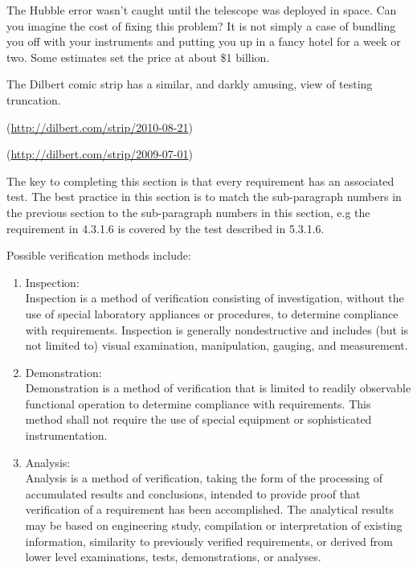 \begin{slshape}
The Hubble error wasn't caught until the telescope was deployed in space.  Can you imagine the cost of fixing this problem?  It is not simply a case of bundling you off with your instruments and putting you up in a fancy hotel for a week or two.  Some estimates set the price at about \$1 billion.
\bigskip

The Dilbert comic strip has a similar, and darkly amusing, view of testing truncation.
\bigskip  

(\url{http://dilbert.com/strip/2010-08-21})
\bigskip

(\url{http://dilbert.com/strip/2009-07-01})
\bigskip



	
The key to completing this section is that every requirement has an associated test.  The best practice in this section is to match the sub-paragraph numbers in the previous section to the sub-paragraph numbers in this section, e.g the requirement in 4.3.1.6 is covered by the test described in 5.3.1.6.
\bigskip

	Possible verification methods include:
	\bigskip
	
	\begin{enumerate}
		\item Inspection:\\

	Inspection is a method of verification consisting of investigation, 
	without the use of special laboratory appliances or procedures, to 
	determine compliance with requirements. Inspection is generally 
	nondestructive and includes (but is not limited to) visual examination, 
	manipulation, gauging, and measurement.

		\item Demonstration:\\

	Demonstration is a method of verification that is limited to readily 
	observable functional operation to determine compliance with 
	requirements. This method shall not require the use of special equipment 
	or sophisticated instrumentation.
	
		\item Analysis:\\

	Analysis is a method of verification, taking the form of the processing of 
	accumulated results and conclusions, intended to provide proof that 
	verification of a requirement has been accomplished. The analytical 
	results may be based on engineering study, compilation or interpretation 
	of existing information, similarity to previously verified requirements, 
	or derived from lower level examinations, tests, demonstrations, or 
	analyses.



\end{enumerate}
\end{slshape}
